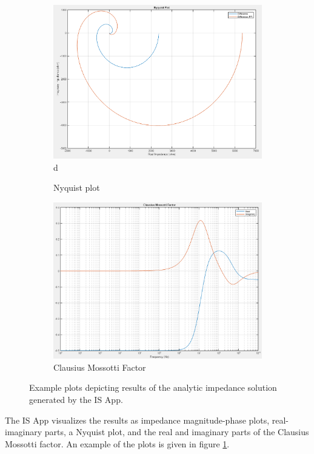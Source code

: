 \begin{figure}[h]
\begin{subfigure}[b]{0.45\textwidth}
        \centering
        \includegraphics[width=\textwidth]{images/IS_APP_Nyquist.png}d
        \caption{Nyquist plot}
    \end{subfigure}
    \hfill
    \begin{subfigure}[b]{0.45\textwidth}
        \centering
        \includegraphics[width=\textwidth]{images/IS_APP_FCM.png}
        \caption{Clausius Mossotti Factor}
    \end{subfigure}
    \caption{Example plots depicting results of the analytic impedance solution generated by the IS App.}
    \label{fig:IS_APP_IS_Results}
\end{figure}

\par The IS App visualizes the results as impedance magnitude-phase plots, real-imaginary parts, a Nyquist plot, and the real and imaginary parts of the Clausius Mossotti factor. An example of the plots is given in figure \ref{fig:IS_APP_IS_Results}.

